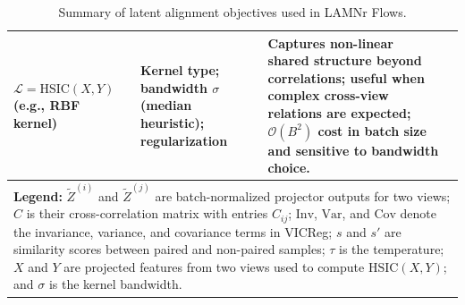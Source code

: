 \begin{table}[t]
\begin{tabular}{p{1.5cm} p{3.75cm} p{3.1cm} p{5.5cm}}
$\mathcal{L} = \mathrm{HSIC}(X,Y)$ (e.g., RBF kernel) &
Kernel type; bandwidth $\sigma$ (median heuristic); regularization &
Captures non-linear shared structure beyond correlations; useful when complex cross-view relations are expected; $\mathcal{O}(B^2)$ cost in batch size and sensitive to bandwidth choice. \\
\hline
\multicolumn{4}{p{14.2cm}}{\textbf{Legend:}
$\tilde Z^{(i)}$ and $\tilde Z^{(j)}$ are batch-normalized projector outputs for
two views; $C$ is their cross-correlation matrix with entries $C_{ij}$;
$\mathrm{Inv}$, $\mathrm{Var}$, and $\mathrm{Cov}$ denote the invariance,
variance, and covariance terms in VICReg; $s$ and $s'$ are similarity scores
between paired and non-paired samples; $\tau$ is the temperature; $X$ and $Y$
are projected features from two views used to compute $\mathrm{HSIC}(X,Y)$; and
$\sigma$ is the kernel bandwidth.} \\
\end{tabular}
\caption{Summary of latent alignment objectives used in LAMNr Flows.}
\label{tab:alignment}
\normalsize
\end{table}
